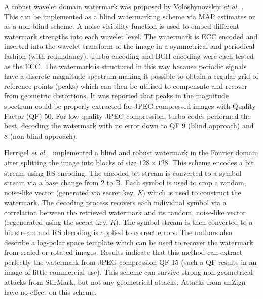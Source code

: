 \documentclass[12pt]{report}
\begin{document}
A robust wavelet domain watermark was proposed by Voloshynovskiy \emph{et al.} \cite{ECCb4:volo}. This can be implemented as a
blind watermarking scheme via MAP estimates or as a non-blind scheme. A noise visibility function is used to embed
different watermark strengths into each wavelet level. The watermark is ECC encoded and inserted into the
wavelet transform of the image in a symmetrical and periodical fashion (with redundancy). Turbo encoding 
and BCH encoding were each tested as the ECC. The watermark is structured in this way because
periodic signals have a discrete magnitude spectrum making it possible to obtain a regular grid of reference points (peaks) which
can then be utilised to compensate and recover from geometric distortions. It was reported that peaks in the magnitude spectrum 
could be properly extracted for JPEG compressed images with Quality Factor (QF) 50. 
For low quality JPEG compression, turbo codes 
performed the best, decoding the watermark with no error down to QF 9 (blind approach) and 8 (non-blind approach).

Herrigel \emph{et al.}~\cite{ECCb4:herr} implemented a blind and robust watermark in the Fourier domain after splitting the image 
into blocks of size $128 \times 128$. This scheme encodes
a bit stream using RS encoding. The encoded bit stream is converted to a symbol stream via a base change from 2 to B. Each symbol
is used to crop a random, noise-like vector (generated via secret key, \emph{K}) which is used to construct the watermark.
The decoding process recovers each individual symbol via a correlation between the retrieved watermark and its random, noise-like
vector (regenerated using the secret key, \emph{K}). The symbol stream is then converted to a bit stream and RS decoding is applied 
to correct errors. The authors also describe a log-polar space template which can be used to recover the watermark from
scaled or rotated images.
Results indicate that this method can extract perfectly the watermark from JPEG compression QF 15 (such a QF results in an image
of little commercial use). This scheme can survive strong non-geometrical attacks from StirMark, but not any geometrical attacks.
Attacks from unZign have no effect on this scheme.
\end{document}
